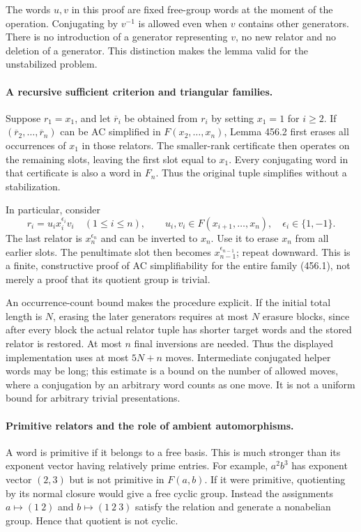 \documentclass[11pt]{article}
\begin{document}
The words $u,v$ in this proof are fixed free-group words at the moment
of the operation. Conjugating by $v^{-1}$ is allowed even when $v$
contains other generators. There is no introduction of a generator
representing $v$, no new relator and no deletion of a generator.
This distinction makes the lemma valid for the unstabilized problem.

\paragraph{A recursive sufficient criterion and triangular families.}
Suppose $r_1=x_1$, and let $\overline r_i$ be obtained from $r_i$
by setting $x_1=1$ for $i\geq2$. If
$(\overline r_2,\ldots,\overline r_n)$ can be AC simplified in
$F(x_2,\ldots,x_n)$, Lemma 456.2 first erases all occurrences of
$x_1$ in those relators. The smaller-rank certificate then operates
on the remaining slots, leaving the first slot equal to $x_1$.
Every conjugating word in that certificate is also a word in $F_n$.
Thus the original tuple simplifies without a stabilization.

In particular, consider
\[
 r_i=u_i x_i^{\epsilon_i}v_i\quad(1\leq i\leq n),\qquad
 u_i,v_i\in F(x_{i+1},\ldots,x_n),\quad\epsilon_i\in\{1,-1\}.
 \tag{456.1}
\]
The last relator is $x_n^{\epsilon_n}$ and can be inverted to $x_n$.
Use it to erase $x_n$ from all earlier slots. The penultimate slot
then becomes $x_{n-1}^{\epsilon_{n-1}}$; repeat downward. This is a
finite, constructive proof of AC simplifiability for the entire family
(456.1), not merely a proof that its quotient group is trivial.

An occurrence-count bound makes the procedure explicit. If the initial
total length is $N$, erasing the later generators requires at most
$N$ erasure blocks, since after every block the actual relator tuple
has shorter target words and the stored relator is restored. At most
$n$ final inversions are needed. Thus the displayed implementation
uses at most $5N+n$ moves. Intermediate conjugated helper words may
be long; this estimate is a bound on the number of allowed moves,
where a conjugation by an arbitrary word counts as one move. It is
not a uniform bound for arbitrary trivial presentations.

\paragraph{Primitive relators and the role of ambient automorphisms.}
A word is primitive if it belongs to a free basis. This is much
stronger than its exponent vector having relatively prime entries.
For example, $a^2b^3$ has exponent vector $(2,3)$ but is not primitive
in $F(a,b)$. If it were primitive, quotienting by its normal closure
would give a free cyclic group. Instead the assignments
$a\mapsto(1\ 2)$ and $b\mapsto(1\ 2\ 3)$ satisfy the relation
and generate a nonabelian group. Hence that quotient is not cyclic.
\end{document}
